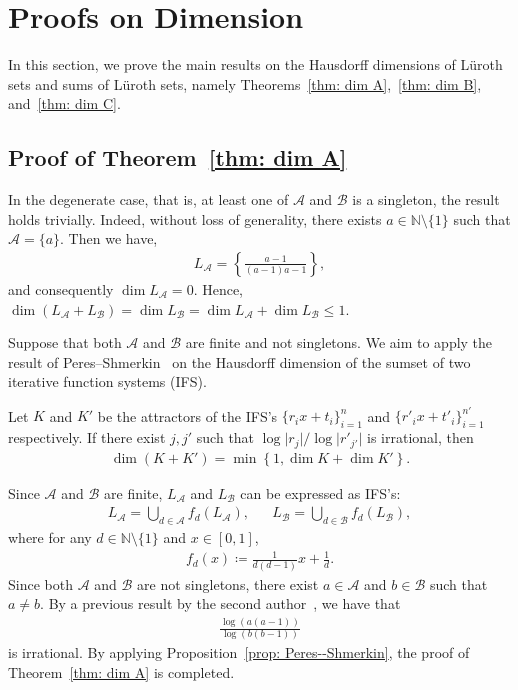\documentclass{ws-ijnt}
\begin{document}
	\section{Proofs on Dimension}
	In this section, we prove the main results on the Hausdorff dimensions of L\"uroth sets and sums of L\"uroth sets, namely Theorems~\ref{thm: dim A},~\ref{thm: dim B}, and~\ref{thm: dim C}.
	
	\subsection{Proof of Theorem~\ref{thm: dim A}}
	
	In the degenerate case, that is, at least one of $\mathcal{A}$ and $\mathcal{B}$ is a singleton, the result holds trivially. Indeed, without loss of generality, there exists $a\in\mathbb{N}\setminus\{1\}$ such that $\mathcal{A} = \{a\}$. Then we have,
	\begin{align*}
		L_{\mathcal{A}}=\left\{\frac{a-1}{(a-1)a-1}\right\},
	\end{align*}
	and consequently $\dim{L_{\mathcal{A}}}=0$. Hence, $\dim{(L_{\mathcal{A}}+L_{\mathcal{B}})}=\dim{L_{\mathcal{B}}}=\dim{L_{\mathcal{A}}}+\dim{L_{\mathcal{B}}}
	\leq1$.
	
	Suppose that both $\mathcal{A}$ and $\mathcal{B}$ are finite and not singletons. We aim to apply the result of Peres--Shmerkin~\cite[Theorem 2]{PERES_SHMERKIN_2009} on the Hausdorff dimension of the sumset of two iterative function systems (IFS).
	\begin{proposition}\label{dimensionres}\label{prop: Peres--Shmerkin}
		Let $K$ and $K'$ be the attractors of the IFS's $\{r_i x+t_i\}_{i=1}^{n}$ and $\{r'_i x+t'_i\}_{i=1}^{n'}$ respectively. If there exist $j, j'$ such that $\log{\lvert r_j \rvert}/\log{\lvert r'_{j'} \rvert}$ is irrational, then
		\begin{align*}
			\dim{(K+K')} = \min{\left\{1,\dim{K}+\dim{K'}\right\}}.
		\end{align*}
	\end{proposition}
	
	Since $\mathcal{A}$ and $\mathcal{B}$ are finite, $L_{\mathcal{A}}$ and $L_{\mathcal{B}}$ can be expressed as IFS's:
	\begin{align*}
		L_{\mathcal{A}}=\bigcup_{d\in\mathcal{A}}f_d(L_{\mathcal{A}}), &&
		L_{\mathcal{B}}=\bigcup_{d\in\mathcal{B}}f_d(L_{\mathcal{B}})
		,
	\end{align*}
	where for any $d\in\mathbb{N}\setminus\{1\}$ and $x\in[0,1]$,
	\begin{align*}
		f_d(x)\coloneqq\frac{1}{d(d-1)}x+\frac{1}{d}.
	\end{align*}
	Since both $\mathcal{A}$ and $\mathcal{B}$ are not singletons, there exist $a\in\mathcal{A}$ and $b\in\mathcal{B}$ such that $a\ne b$. By a previous result by the second author~\cite{lee2024explicitupperboundsdecay}, we have that
	\begin{align*}
		\frac{\log(a(a-1))}{\log(b(b-1))}
	\end{align*}
	is irrational. By applying Proposition~\ref{prop: Peres--Shmerkin}, the proof of Theorem~\ref{thm: dim A} is completed.
	
\end{document}
